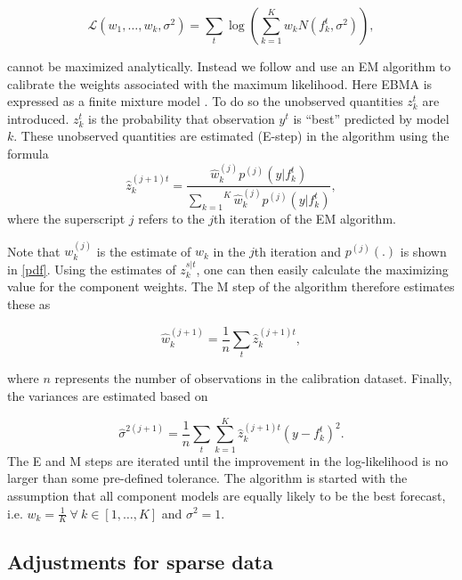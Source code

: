 \documentclass[12pt,fullpage,endnotes]{article}
\begin{document}
\begin{equation}
\mathcal{L}(w_1, \ldots, w_k, \sigma^2)=\sum_t\log\left(\sum_{k=1}^Kw_kN(f^t_k, \sigma^2) \right),
\end{equation}


\noindent cannot be maximized analytically. Instead we follow \citet{Raftery:2005} and use an EM algorithm to calibrate the weights associated with the maximum likelihood. Here EBMA is expressed as a finite mixture model
\citep{mclachlan:peel:2000,imai:tingley:2012}.  To do so the
unobserved quantities $z_k^t$ are introduced. $z_k^t$ is the probability that
observation $y^t$ is ``best'' predicted by model $k$. These unobserved quantities are estimated (E-step) in the algorithm using the formula
\begin{equation}
\label{E-step}
\hat{z}^{(j+1)t}_{k} = \frac{\hat{w}^{(j)}_k
p^{(j)}(y|f_{k}^{t})}{\overset{K}{\underset{k=1}{\sum}}\hat{w}^{(j)}_kp^{(j)}(y|f_{k}^{t})},
\end{equation}
\noindent where the superscript $j$ refers to the $j$th iteration of
the EM algorithm.

Note that $w_k^{(j)}$ is the estimate of $w_k$ in the $j$th iteration and
$p^{(j)}(.)$ is shown in \eqref{pdf}. Using the estimates of
$z_{k}^{s|t}$, one can then easily calculate the maximizing value for the component weights. The M step of the algorithm therefore estimates these as 

\begin{equation}
\label{M-step}
\hat{w}^{(j+1)}_k=\frac{1}{n}\underset{t}{\sum}\hat{z}^{(j+1)t}_{k},
\end{equation}

\noindent where $n$ represents the number of observations in the
calibration dataset. Finally, the variances are estimated based on

\begin{equation}
\label{sigma}
\hat{\sigma}^{2(j+1)}=\frac{1}{n}\underset{t}{\sum}\overset{K}{\underset{k=1}{\sum}}\hat{z}^{(j+1)t}_{k}(y-f_{k}^{t})^2.
\end{equation}
\noindent The E and M steps are iterated until the improvement in the
log-likelihood is no larger than some pre-defined tolerance. The algorithm is started with the assumption that all component models are equally likely to be the best forecast, i.e. $w_k = \frac{1}{K} ~ \forall ~ k \in [1, \ldots, K]$ and
$\sigma^2=1$.

\subsection{Adjustments for sparse data}
\end{document}
